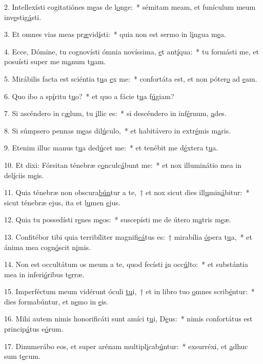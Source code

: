 2. Intellexísti cogitatiónes m\uline{e}as de l\uline{o}nge:~* sémitam meam, et funículum meum inv\uline{e}stig\uline{á}sti.\par 
3. Et omnes vias meas pr\uline{æ}vid\uline{í}sti:~* quia non est sermo in l\uline{i}ngua m\uline{e}a.\par 
4. Ecce, Dómine, tu cognovísti ómnia novíssima, \uline{e}t ant\uline{í}qua:~* tu formásti me, et posuísti super me m\uline{a}num t\uline{u}am.\par 
5. Mirábilis facta est sciéntia t\uline{u}a \uline{e}x me:~* confortáta est, et non póter\uline{o} ad \uline{e}am.\par 
6. Quo ibo a sp\uline{í}ritu t\uline{u}o?~* et quo a fácie t\uline{u}a f\uline{ú}giam?\par 
7. Si ascéndero in c\uline{æ}lum, tu \uline{i}llic es:~* si descéndero in inf\uline{é}rnum, \uline{a}des.\par 
8. Si súmpsero pennas m\uline{e}as dil\uline{ú}culo,~* et habitávero in extr\uline{é}mis m\uline{a}ris.\par 
9. Etenim illuc manus t\uline{u}a ded\uline{ú}cet me:~* et tenébit me d\uline{é}xtera t\uline{u}a.\par 
10. Et dixi: Fórsitan ténebræ c\uline{o}nculc\uline{á}bunt me:~* et nox illuminátio mea in del\uline{í}ciis m\uline{e}is.\par 
11. Quia ténebræ non obscura\uline{bún}tur a te,~† et nox sicut dies ill\uline{u}min\uline{á}bitur:~* sicut ténebræ ejus, ita et l\uline{u}men \uline{e}jus.\par 
12. Quia tu possedísti r\uline{e}nes m\uline{e}os:~* suscepísti me de útero m\uline{a}tris m\uline{e}æ.\par 
13. Confitébor tibi quia terribíliter magnifi\uline{cá}tus es:~† mirabília \uline{ó}pera t\uline{u}a,~* et ánima mea cogn\uline{ó}scit n\uline{i}mis.\par 
14. Non est occultátum os meum a te, quod fecísti \uline{i}n occ\uline{ú}lto:~* et substántia mea in inferi\uline{ó}ribus t\uline{e}rræ.\par 
15. Imperféctum meum vidérunt óculi \uline{tu}i,~† et in libro tuo \uline{o}mnes scrib\uline{é}ntur:~* dies formabúntur, et n\uline{e}mo in \uline{e}is.\par 
16. Mihi autem nimis honorificáti sunt amíci t\uline{u}i, D\uline{e}us:~* nimis confortátus est princip\uline{á}tus e\uline{ó}rum.\par 
17. Dinumerábo eos, et super arénam multipl\uline{i}cab\uline{ú}ntur:~* exsurréxi, et \uline{a}dhuc sum t\uline{e}cum.\par 
